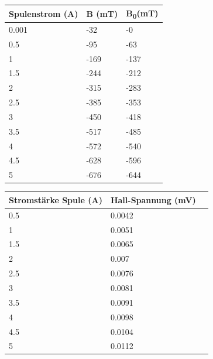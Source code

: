 \documentclass[titlepage=firstcover, captions=tableheading]{scrartcl}
\begin{document}
\begin{center}
    \begin{tabular}{lll}
        \toprule
        Spulenstrom (A) & B (mT) & B\textsubscript{0}(mT) \\
        \midrule 
        0.001     &   -32    & -0 \\
        0.5       &   -95    & -63 \\
        1         &   -169   & -137\\ 
        1.5       &   -244   & -212\\ 
        2         &   -315   & -283\\ 
        2.5       &   -385   & -353\\ 
        3         &   -450   & -418\\ 
        3.5       &   -517   & -485\\ 
        4         &   -572   & -540\\ 
        4.5       &   -628   & -596\\ 
        5         &   -676   & -644\\
        \bottomrule
    \end{tabular}
\end{center}

\begin{center}
    \begin{tabular}{lll}
        \toprule
        Stromstärke Spule (A) & Hall-Spannung (mV) \\
        \midrule 
          0.5      & 0.0042\\
          1        & 0.0051\\
          1.5      & 0.0065\\ 
          2        & 0.007\\ 
          2.5      & 0.0076\\ 
          3        & 0.0081\\ 
          3.5      & 0.0091\\ 
          4        & 0.0098\\ 
          4.5      & 0.0104\\ 
          5        & 0.0112\\ 
        \bottomrule
    \end{tabular}
\end{center}
\end{document}
